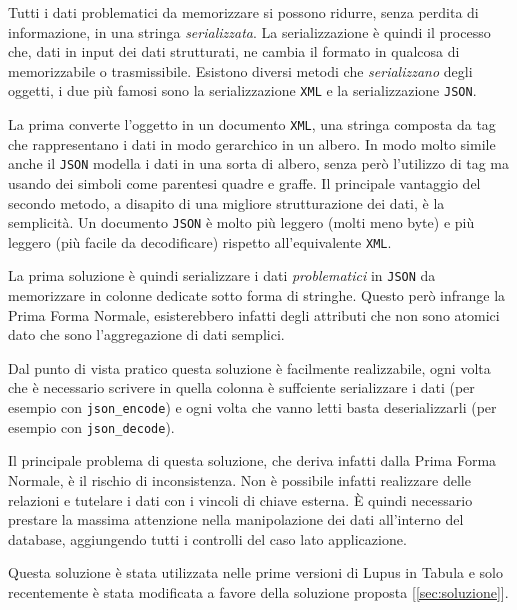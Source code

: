 Tutti i dati problematici da memorizzare si possono ridurre, senza perdita di informazione, in una stringa \emph{serializzata}. La serializzazione è quindi il processo che, dati in input dei dati strutturati, ne cambia il formato in qualcosa di memorizzabile o trasmissibile. Esistono diversi metodi che \emph{serializzano} degli oggetti, i due più famosi sono la serializzazione \texttt{XML} e la serializzazione \texttt{JSON}. 

La prima converte l'oggetto in un documento \texttt{XML}, una stringa composta da tag che rappresentano i dati in modo gerarchico in un albero. In modo molto simile anche il \texttt{JSON} modella i dati in una sorta di albero, senza però l'utilizzo di tag ma usando dei simboli come parentesi quadre e graffe. Il principale vantaggio del secondo metodo, a disapito di una migliore strutturazione dei dati, è la semplicità. Un documento \texttt{JSON} è molto più leggero (molti meno byte) e più leggero (più facile da decodificare) rispetto all'equivalente \texttt{XML}.

La prima soluzione è quindi serializzare i dati \emph{problematici} in \texttt{JSON} da memorizzare in colonne dedicate sotto forma di stringhe. Questo però infrange la Prima Forma Normale, esisterebbero infatti degli attributi che non sono atomici dato che sono l'aggregazione di dati semplici.

Dal punto di vista pratico questa soluzione è facilmente realizzabile, ogni volta che è necessario scrivere in quella colonna è suffciente serializzare i dati (per esempio con \texttt{json\_encode}) e ogni volta che vanno letti basta deserializzarli (per esempio con \texttt{json\_decode}).

Il principale problema di questa soluzione, che deriva infatti dalla Prima Forma Normale, è il rischio di inconsistenza. Non è possibile infatti realizzare delle relazioni e tutelare i dati con i vincoli di chiave esterna. È quindi necessario prestare la massima attenzione nella manipolazione dei dati all'interno del database, aggiungendo tutti i controlli del caso lato applicazione.

Questa soluzione è stata utilizzata nelle prime versioni di Lupus in Tabula e solo recentemente è stata modificata a favore della soluzione proposta [\ref{sec:soluzione}].
